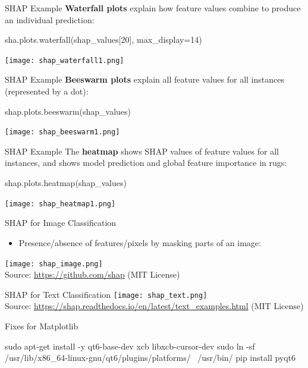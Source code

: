 \documentclass[ignorenonframetext,xcolor=x11names]{beamer}
\begin{document}
\begin{frame}[fragile]{SHAP Example}
\textbf{Waterfall plots} explain how feature values combine to produce an individual prediction:
\begin{pythoncode}
sha.plots.waterfall(shap_values[20], max_display=14)
\end{pythoncode}
\begin{center}
\texttt{[image: shap\_waterfall1.png]}
\end{center}
\end{frame}

\begin{frame}[fragile]{SHAP Example}
\textbf{Beeswarm plots} explain all feature values for all instances (represented by a dot):
\begin{pythoncode}
shap.plots.beeswarm(shap_values)
\end{pythoncode}
\begin{center}
\texttt{[image: shap\_beeswarm1.png]}
\end{center}
\end{frame}

\begin{frame}[fragile]{SHAP Example}
The \textbf{heatmap} shows SHAP values of feature values for all instances, and shows model prediction and global feature importance in rugs:
\begin{pythoncode}
shap.plots.heatmap(shap_values)
\end{pythoncode}
\begin{center}
\texttt{[image: shap\_heatmap1.png]}
\end{center}
\end{frame}

\begin{frame}{SHAP for Image Classification}
\begin{itemize}
\item Presence/absence of features/pixels by masking parts of an image:
\end{itemize}

\texttt{[image: shap\_image.png]} \\

\scriptsize Source: \url{https://github.com/shap} (MIT License)
\end{frame}

\begin{frame}{SHAP for Text Classification}
\texttt{[image: shap\_text.png]} \\

\scriptsize Source: \url{https://shap.readthedocs.io/en/latest/text_examples.html} (MIT License)
\end{frame}

\begin{frame}[fragile]{Fixes for Matplotlib}
\begin{bashcode}
sudo apt-get install -y qt6-base-dev xcb libxcb-cursor-dev
sudo ln -sf /usr/lib/x86_64-linux-gnu/qt6/plugins/platforms/ \
    /usr/bin/
pip install pyqt6
\end{bashcode}
\end{frame}
\end{document}
